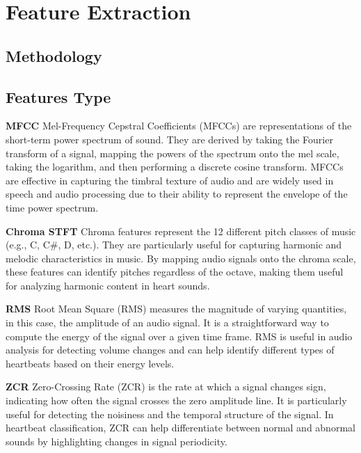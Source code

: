 \section{Feature Extraction}

\subsection{Methodology}
\subsection{Features Type}

\textbf{MFCC}\newline
Mel-Frequency Cepstral Coefficients (MFCCs) are representations of the short-term power spectrum of sound. They are derived by taking the Fourier transform of a signal, mapping the powers of the spectrum onto the mel scale, taking the logarithm, and then performing a discrete cosine transform. MFCCs are effective in capturing the timbral texture of audio and are widely used in speech and audio processing due to their ability to represent the envelope of the time power spectrum.

\vspace{0.5cm}\noindent
\textbf{Chroma STFT}\newline
Chroma features represent the 12 different pitch classes of music (e.g., C, C\#, D, etc.). They are particularly useful for capturing harmonic and melodic characteristics in music. By mapping audio signals onto the chroma scale, these features can identify pitches regardless of the octave, making them useful for analyzing harmonic content in heart sounds.

\vspace{0.5cm}\noindent
\textbf{RMS}\newline
Root Mean Square (RMS) measures the magnitude of varying quantities, in this case, the amplitude of an audio signal. It is a straightforward way to compute the energy of the signal over a given time frame. RMS is useful in audio analysis for detecting volume changes and can help identify different types of heartbeats based on their energy levels.

\vspace{0.5cm}\noindent
\textbf{ZCR}\newline
Zero-Crossing Rate (ZCR) is the rate at which a signal changes sign, indicating how often the signal crosses the zero amplitude line. It is particularly useful for detecting the noisiness and the temporal structure of the signal. In heartbeat classification, ZCR can help differentiate between normal and abnormal sounds by highlighting changes in signal periodicity.

